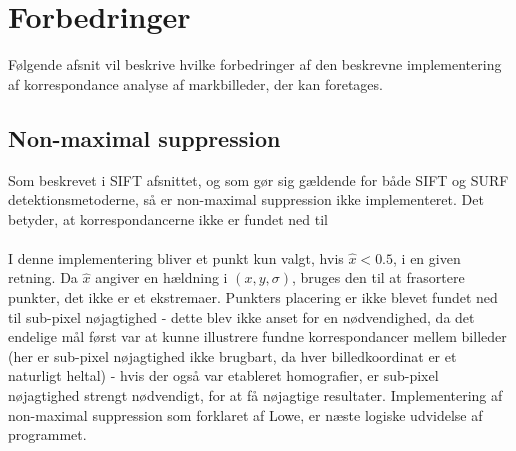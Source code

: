 \section{Forbedringer}
Følgende afsnit vil beskrive hvilke forbedringer af den beskrevne implementering af korrespondance analyse af markbilleder, der kan foretages. 

\subsection{Non-maximal suppression}
Som beskrevet i SIFT afsnittet, og som gør sig gældende for både SIFT og SURF detektionsmetoderne, så er non-maximal suppression ikke implementeret. Det betyder, at korrespondancerne ikke er fundet ned til 
\\
\\
I denne implementering bliver et punkt kun valgt, hvis $\hat{x} < 0.5$, i en given retning. Da $\hat{x}$ angiver en hældning i $(x, y, \sigma)$, bruges den til at frasortere punkter, det ikke er et ekstremaer. Punkters placering er ikke blevet fundet ned til sub-pixel nøjagtighed - dette blev ikke anset for en nødvendighed, da det endelige mål først var at kunne illustrere fundne korrespondancer mellem billeder (her er sub-pixel nøjagtighed ikke brugbart, da hver billedkoordinat er et naturligt heltal) - hvis der også var etableret homografier, er sub-pixel nøjagtighed strengt nødvendigt, for at få nøjagtige resultater. Implementering af non-maximal suppression som forklaret af Lowe, er næste logiske udvidelse af programmet. 
